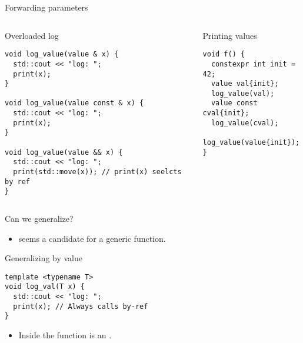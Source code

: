 \begin{frame}[t,fragile]{Forwarding parameters}
\begin{columns}[T]

\begin{block}{Overloaded log}
\begin{lstlisting}
void log_value(value & x) {
  std::cout << "log: ";
  print(x);
}

void log_value(value const & x) {
  std::cout << "log: ";
  print(x);
}

void log_value(value && x) {
  std::cout << "log: ";
  print(std::move(x)); // print(x) seelcts by ref
}
\end{lstlisting}
\end{block}

\pause
{}
\begin{block}{Printing values}
\begin{lstlisting}
void f() {
  constexpr int init = 42;
  value val{init};
  log_value(val);
  value const cval{init};
  log_value(cval);
  log_value(value{init});
}
\end{lstlisting}
\end{block}

\end{columns}

\end{frame}

\begin{frame}[t,fragile]{Can we generalize?}
\begin{itemize}
  \item {} seems a candidate for a generic function.
\end{itemize}

\begin{block}{Generalizing by value}
\begin{lstlisting}
template <typename T>
void log_val(T x) { 
  std::cout << "log: ";
  print(x); // Always calls by-ref
}
\end{lstlisting}
\end{block}

\begin{itemize}
  \item Inside the function  is an .
\end{itemize}

\end{frame}
